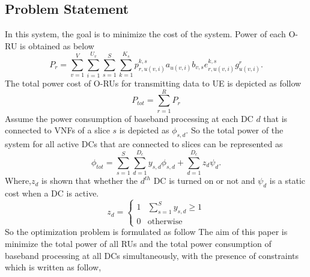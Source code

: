 \documentclass[conference]{IEEEtran}
\begin{document}
\subsection{Problem Statement}
In this system, the goal is to minimize the cost of the system.
Power of each O-RU is obtained as below
\begin{equation}
P_r =  \sum_{v=1}^{V} \sum_{i=1}^{U_v} \sum_{s=1}^{S} \sum_{k=1}^{K_s}p_{r,u(v,i)}^{k,s}a_{u(v,i)} b_{v, s} e^{k,s}_{r,u(v,i)}g_{u(v,i)}^r.
\end{equation}
The total power cost of O-RUs for transmitting data to UE is depicted as follow
\begin{equation}
P_{tot} = \sum_{r=1}^{R}P_r
\end{equation}
Assume the power consumption of baseband processing at each DC $d$ that is connected to VNFs of a slice $s$ is depicted as
$\phi_{s,d}$. So the total power of the system for all active DCs that are connected to slices can be represented as
\begin{equation*}
\textstyle \phi_{tot} = \sum_{s=1}^{S}\sum_{d=1}^{D_c}y_{s,d}\phi_{s,d} + \sum_{d=1}^{D_c}z_d \psi_d .
\end{equation*}
Where,$z_d$ is shown that whether the $d^{th}$ DC is turned on or not and $\psi_d$ is a static cost when a DC is active.
\begin{equation}
  z_d =
    \begin{cases}
      1 & \sum_{s=1}^{S}y_{s,d} \geq 1 \\
      0 & \text{otherwise}
    \end{cases}       
\end{equation}  
So the optimization problem is formulated as follow
The aim of this paper is minimize the total power of all RUs and the total power consumption of baseband processing at all DCs simultaneously, with the presence of constraints which is written as follow,
\end{document}
